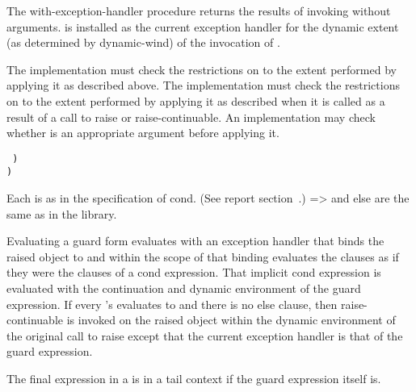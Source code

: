 \begin{entry}{%
}

  The {\cf
with-exception-handler} procedure returns the results of invoking
 without arguments.   is installed as the current
exception handler for the dynamic extent (as determined by {\cf
  dynamic-wind}) of the invocation of .

\implresp The implementation must check the restrictions on
 to the extent performed by applying it as described above.
The implementation must check the restrictions on
 to the extent performed by applying it as described
when it is called as a result of a call to {\cf raise} or {\cf
  raise-continuable}.
An
implementation may check whether  is an appropriate argument
before applying it.
\end{entry}

\begin{entry}{%
{\tt\obeyspaces%
\hspace*{3em}  \dotsfoo)\\
\hspace*{2em})}\\
\litprotonoindex{=>}
}
\schindex{=>}

\syntax
Each  is as in the specification of {\cf cond}.
(See report section~.)
{\cf =>} and {\cf else} are the same as in the  library.

\semantics 
Evaluating a {\cf guard} form evaluates  with an exception
handler that binds the raised object to  and within the scope of
that binding evaluates the clauses as if they were the clauses of a
{\cf cond} expression. That implicit {\cf cond} expression is evaluated with the
continuation and dynamic environment of the {\cf guard} expression. If every
's  evaluates to \schfalse{} and there
is no {\cf else} clause, then
{\cf raise-continuable} is invoked on the raised object within the dynamic
environment of the original call to {\cf raise} except that the current
exception handler is that of the {\cf guard} expression.  

The final expression in a  is in a tail context if
the {\cf guard} expression itself is.
\end{entry}

